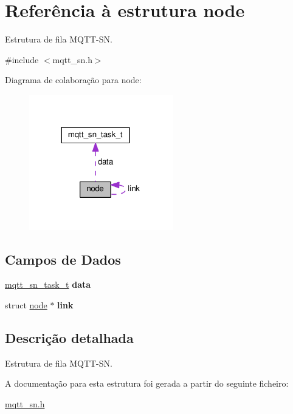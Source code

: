 \hypertarget{structnode}{\section{Referência à estrutura node}
\label{structnode}
}


Estrutura de fila M\+Q\+T\+T-\/\+S\+N.  




{\ttfamily \#include $<$mqtt\+\_\+sn.\+h$>$}



Diagrama de colaboração para node\+:
\nopagebreak
\begin{figure}[H]
\begin{center}
\leavevmode
\includegraphics[width=178pt]{structnode__coll__graph}
\end{center}
\end{figure}
\subsection*{Campos de Dados}
\begin{DoxyCompactItemize}
\item 
\hypertarget{structnode_a2a4aa9e422389a8d7a97309a99143ce2}{\hyperlink{structmqtt__sn__task__t}{mqtt\+\_\+sn\+\_\+task\+\_\+t} {\bfseries data}}\label{structnode_a2a4aa9e422389a8d7a97309a99143ce2}

\item 
\hypertarget{structnode_ae20eb3a9a05750fd84dd04b48a8940c3}{struct \hyperlink{structnode}{node} $\ast$ {\bfseries link}}\label{structnode_ae20eb3a9a05750fd84dd04b48a8940c3}

\end{DoxyCompactItemize}


\subsection{Descrição detalhada}
Estrutura de fila M\+Q\+T\+T-\/\+S\+N. 

A documentação para esta estrutura foi gerada a partir do seguinte ficheiro\+:\begin{DoxyCompactItemize}
\item 
\hyperlink{mqtt__sn_8h}{mqtt\+\_\+sn.\+h}\end{DoxyCompactItemize}
